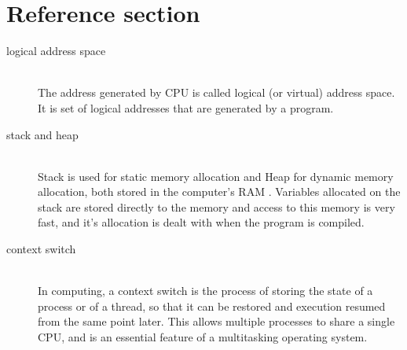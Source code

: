 \documentclass{article}
\begin{document}
\section*{Reference section} \label{sec:reference}
\begin{description}
	\item[logical address space] \hfill \\ The address generated by CPU is called logical (or virtual) address space. It is set of logical addresses that are generated by a program.
	\item[stack and heap] \hfill \\ Stack is used for static memory allocation and Heap for dynamic memory allocation, both stored in the computer's RAM . Variables allocated on the stack are stored directly to the memory and access to this memory is very fast, and it's allocation is dealt with when the program is compiled.
	\item[context switch] \hfill \\ In computing, a context switch is the process of storing the state of a process or of a thread, so that it can be restored and execution resumed from the same point later. This allows multiple processes to share a single CPU, and is an essential feature of a multitasking operating system.
\end{description}
\end{document}
